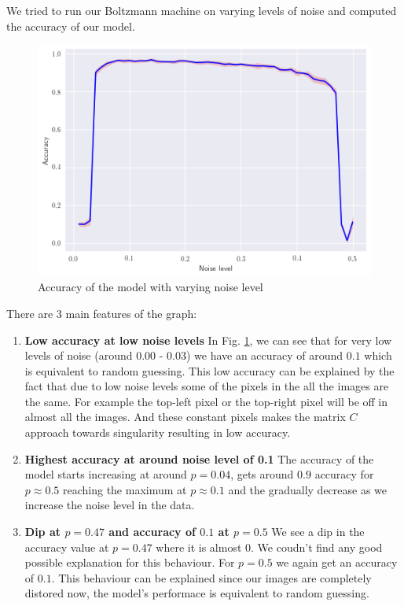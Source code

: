 \documentclass{article}
\begin{document}
We tried to run our Boltzmann machine on varying levels of noise and computed
the accuracy of our model.

\begin{figure}[h]
  \centering
  \includegraphics[width=\textwidth]{noise_vs_acc}
  \caption{Accuracy of the model with varying noise level}
  \label{fig:noise_vs_acc}
\end{figure}

There are 3 main features of the graph:
\begin{enumerate}

  \item \textbf {Low accuracy at low noise levels} \break
    In Fig. \ref{fig:noise_vs_acc}, we can see that for very low levels of noise 
    (around 0.00 - 0.03) we have an accuracy of around $ 0.1 $ which is 
    equivalent to random guessing. This low accuracy can be explained by the 
    fact that due to low noise levels some of the pixels in the all the images
    are the same. For example the top-left pixel or the top-right pixel will
    be off in almost all the images. And these constant pixels makes the matrix
    $ C $ approach towards singularity resulting in low accuracy.

  \item \textbf{Highest accuracy at around noise level of 0.1} \break
    The accuracy of the model starts increasing at around $ p=0.04 $, gets 
    around $ 0.9 $ accuracy for $ p \approx 0.5 $ reaching the maximum at 
    $ p \approx 0.1 $ and the gradually decrease as we increase the noise
    level in the data.

  \item \textbf{Dip at $ p=0.47 $ and accuracy of $ 0.1 $ at $ p=0.5 $} \break
    We see a dip in the accuracy value at $ p=0.47 $ where it is almost $ 0 $.
    We coudn't find any good possible explanation for this behaviour. For 
    $ p = 0.5 $ we again get an accuracy of $ 0.1 $. This behaviour can be 
    explained since our images are completely distored now, the model's 
    performace is equivalent to random guessing.

\end{enumerate}
\end{document}
